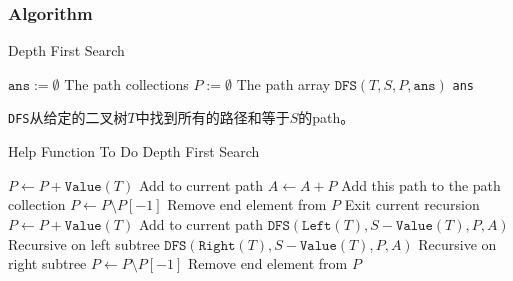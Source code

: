 \subsubsection{Algorithm}
\setcounter{algorithm}{0}
\begin{algorithm}[H]
\caption{Depth First Search}
\begin{algorithmic}[1]
\State $\texttt{ans}:=\emptyset$ \Comment The path collections
\State $P:=\emptyset$ \Comment The path array
\State $\texttt{DFS}(T, S, P, \texttt{ans})$
\State \Return \texttt{ans}
\EndProcedure
\end{algorithmic}
\end{algorithm}
\begin{CJK*}{UTF8}{gbsn}
\texttt{DFS}从给定的二叉树$T$中找到所有的路径和等于$S$的path。
\end{CJK*}
\begin{algorithm}[H]
\caption{Help Function To Do Depth First Search}
\begin{algorithmic}[1]
\State \Return
\EndIf
{}
\State $P\gets P + \texttt{Value}(T)$ \Comment Add to current path
\State $A\gets A +  P$ \Comment Add this path to the path collection
\State $P\gets P\setminus P[-1]$ \Comment Remove end element from $P$
\EndIf
\State \Return  \Comment Exit current recursion
\EndIf
\State $P\gets P + \texttt{Value}(T)$ \Comment Add to current path
\State $\texttt{DFS}(\texttt{Left}(T), S - \texttt{Value}(T), P, A)$ \Comment Recursive on left subtree
\State $\texttt{DFS}(\texttt{Right}(T), S - \texttt{Value}(T), P, A)$ \Comment Recursive on right subtree
\State $P\gets P\setminus P[-1]$ \Comment Remove end element from $P$
\EndFunction
\end{algorithmic}
\end{algorithm}